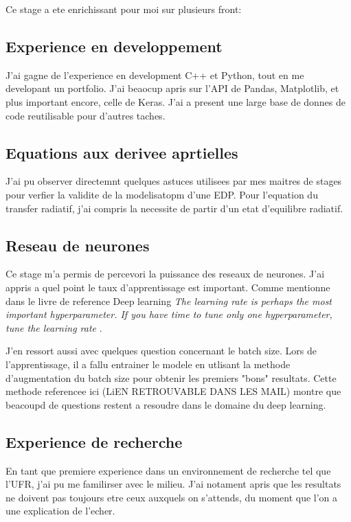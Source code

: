 Ce stage a ete enrichissant pour moi sur plusieurs front:

\subsection{Experience en developpement}
J'ai gagne de l'experience en development C++ et Python, tout en me developant un portfolio. J'ai beaocup apris sur l'API de Pandas, Matplotlib, et plus important encore, celle de Keras. J'ai a present une large base de donnes de code reutilisable pour d'autres taches.

\subsection{Equations aux derivee aprtielles}
J'ai pu observer directemnt quelques astuces utilisees par mes maitres de stages pour verfier la validite de la modelisatopm d'une EDP. Pour l'equation du transfer radiatif, j'ai compris la necessite de partir d'un etat d'equilibre radiatif.

\subsection{Reseau de neurones}
Ce stage m'a permis de percevori la puissance des reseaux de neurones. J'ai appris a quel point le taux d'apprentissage est important. Comme mentionne dans le livre de reference Deep learning \textit{The learning rate is perhaps the most important hyperparameter. If you have time to tune only one hyperparameter, tune the learning rate} \parencite[417]{Reference5}. 

J'en ressort aussi avec quelques question concernant le batch size. Lors de l'apprentissage, il a fallu entrainer le modele en utlisant la methode d'augmentation du batch size pour obtenir les premiers "bons" resultats. Cette methode referencee ici (LiEN RETROUVABLE DANS LES MAIL) montre que beacoupd de questions restent a resoudre dans le domaine du deep learning.

\subsection{Experience de recherche}
En tant que premiere experience dans un environnement de recherche tel que l'UFR, j'ai pu me familirser avec le milieu. J'ai notament apris que les resultats ne doivent pas toujours etre ceux auxquels on s'attends, du moment que l'on a une explication de l'echer.

